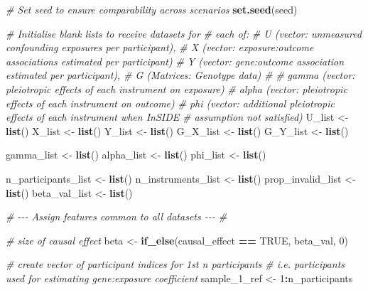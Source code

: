 \documentclass[
]{article}
\newenvironment{Shaded}{\begin{snugshade}}{\end{snugshade}}
\newcommand{\CommentTok}[1]{\textcolor[rgb]{0.56,0.35,0.01}{\textit{#1}}}
\newcommand{\ConstantTok}[1]{\textcolor[rgb]{0.56,0.35,0.01}{#1}}
\newcommand{\DecValTok}[1]{\textcolor[rgb]{0.00,0.00,0.81}{#1}}
\newcommand{\FunctionTok}[1]{\textcolor[rgb]{0.13,0.29,0.53}{\textbf{#1}}}
\newcommand{\NormalTok}[1]{#1}
\newcommand{\OtherTok}[1]{\textcolor[rgb]{0.56,0.35,0.01}{#1}}
\newcommand{\SpecialCharTok}[1]{\textcolor[rgb]{0.81,0.36,0.00}{\textbf{#1}}}
\begin{document}
\begin{Shaded}
\begin{Highlighting}[]
  \CommentTok{\# Set seed to ensure comparability across scenarios}
  \FunctionTok{set.seed}\NormalTok{(seed)}
  
  \CommentTok{\# Initialise blank lists to receive datasets for}
  \CommentTok{\# each of:}
  \CommentTok{\#     U (vector: unmeasured confounding exposures per participant), }
  \CommentTok{\#     X (vector: exposure:outcome associations estimated per participant) }
  \CommentTok{\#     Y (vector: gene:outcome association estimated per participant), }
  \CommentTok{\#     G (Matrices: Genotype data)}
  \CommentTok{\#}
  \CommentTok{\#     gamma (vector: pleiotropic effects of each instrument on exposure)}
  \CommentTok{\#     alpha (vector: pleiotropic effects of each instrument on outcome)}
  \CommentTok{\#     phi (vector: additional pleiotropic effects of each instrument when InSIDE }
  \CommentTok{\#     assumption not satisfied)}
\NormalTok{  U\_list }\OtherTok{\textless{}{-}} \FunctionTok{list}\NormalTok{()}
\NormalTok{  X\_list }\OtherTok{\textless{}{-}} \FunctionTok{list}\NormalTok{()}
\NormalTok{  Y\_list }\OtherTok{\textless{}{-}} \FunctionTok{list}\NormalTok{()}
\NormalTok{  G\_X\_list }\OtherTok{\textless{}{-}} \FunctionTok{list}\NormalTok{()}
\NormalTok{  G\_Y\_list }\OtherTok{\textless{}{-}} \FunctionTok{list}\NormalTok{()}
  
\NormalTok{  gamma\_list }\OtherTok{\textless{}{-}} \FunctionTok{list}\NormalTok{()}
\NormalTok{  alpha\_list }\OtherTok{\textless{}{-}} \FunctionTok{list}\NormalTok{()}
\NormalTok{  phi\_list }\OtherTok{\textless{}{-}} \FunctionTok{list}\NormalTok{()}
  
  
\NormalTok{  n\_participants\_list }\OtherTok{\textless{}{-}} \FunctionTok{list}\NormalTok{()}
\NormalTok{  n\_instruments\_list }\OtherTok{\textless{}{-}} \FunctionTok{list}\NormalTok{()}
\NormalTok{  prop\_invalid\_list }\OtherTok{\textless{}{-}} \FunctionTok{list}\NormalTok{()}
\NormalTok{  beta\_val\_list }\OtherTok{\textless{}{-}} \FunctionTok{list}\NormalTok{()}
  
  
  
  \CommentTok{\# {-}{-}{-} Assign features common to all datasets {-}{-}{-} \#}
  
  \CommentTok{\# size of causal effect}
\NormalTok{  beta }\OtherTok{\textless{}{-}} \FunctionTok{if\_else}\NormalTok{(causal\_effect }\SpecialCharTok{==} \ConstantTok{TRUE}\NormalTok{, }
\NormalTok{                  beta\_val,}
                  \DecValTok{0}\NormalTok{)}
  
  \CommentTok{\# create vector of participant indices for 1st n participants}
  \CommentTok{\# i.e. participants used for estimating gene:exposure coefficient}
\NormalTok{  sample\_1\_ref }\OtherTok{\textless{}{-}} \DecValTok{1}\SpecialCharTok{:}\NormalTok{n\_participants        }
  

\end{Highlighting}
\end{Shaded}
\end{document}
